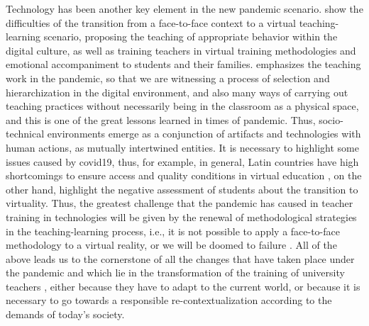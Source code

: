 \documentclass[english]{textolivre}
\begin{document}
Technology has been another key element in the new pandemic scenario. \textcite{talavera2020} %
show the difficulties of the transition from a face-to-face context to a virtual teaching-learning scenario, proposing the teaching of appropriate behavior within the digital culture, as well as training teachers in virtual training methodologies and emotional accompaniment to students and their families. \textcite{dussel2020} %
emphasizes the teaching work in the pandemic, so that we are witnessing a process of selection and hierarchization in the digital environment, and also many ways of carrying out teaching practices without necessarily being in the classroom as a physical space, and this is one of the great lessons learned in times of pandemic. Thus, socio-technical environments emerge as a conjunction of artifacts and technologies with human actions, as mutually intertwined entities. It is necessary to highlight some issues caused by covid19, thus, for example, in general, Latin countries have high shortcomings to ensure access and quality conditions in virtual education \textcite{sanchez2020}, %
on the other hand, \textcite{tejedor2020} %
highlight the negative assessment of students about the transition to virtuality. Thus, the greatest challenge that the pandemic has caused in teacher training in technologies will be given by the renewal of methodological strategies in the teaching-learning process, i.e., it is not possible to apply a face-to-face methodology to a virtual reality, or we will be doomed to failure \cite{talavera2020}. %
All of the above leads us to the cornerstone of all the changes that have taken place under the pandemic and which lie in the transformation of the training of university teachers \cite{suarez2020}, %
either because they have to adapt to the current world, or because it is necessary to go towards a responsible re-contextualization according to the demands of today's society.
\end{document}
